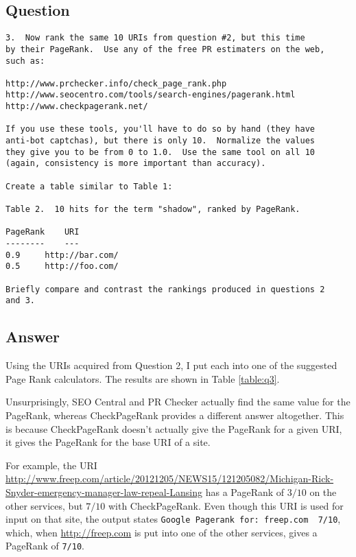 \documentclass[letterpaper,11pt]{article}
\begin{document}
\subsection*{Question}

\begin{verbatim}
3.  Now rank the same 10 URIs from question #2, but this time 
by their PageRank.  Use any of the free PR estimaters on the web,
such as:

http://www.prchecker.info/check_page_rank.php
http://www.seocentro.com/tools/search-engines/pagerank.html
http://www.checkpagerank.net/

If you use these tools, you'll have to do so by hand (they have
anti-bot captchas), but there is only 10.  Normalize the values
they give you to be from 0 to 1.0.  Use the same tool on all 10
(again, consistency is more important than accuracy).

Create a table similar to Table 1:

Table 2.  10 hits for the term "shadow", ranked by PageRank.

PageRank	URI
--------	---
0.9		http://bar.com/
0.5		http://foo.com/

Briefly compare and contrast the rankings produced in questions 2
and 3.
\end{verbatim}

\newpage
\subsection*{Answer}

Using the URIs acquired from Question 2, I put each into one of the suggested Page Rank calculators.  The results are shown in Table \ref{table:q3}.

Unsurprisingly, SEO Central and PR Checker actually find the same value for the PageRank, whereas CheckPageRank provides a different answer altogether.  This is because CheckPageRank doesn't actually give the PageRank for a given URI, it gives the PageRank for the base URI of a site.

For example, the URI \url{http://www.freep.com/article/20121205/NEWS15/121205082/Michigan-Rick-Snyder-emergency-manager-law-repeal-Lansing} has a PageRank of $3/10$ on the other services, but $7/10$ with CheckPageRank.  Even though this URI is used for input on that site, the output states \verb+Google Pagerank for: freep.com  7/10+, which, when \url{http://freep.com} is put into one of the other services, gives a PageRank of \verb+7/10+.
\end{document}
